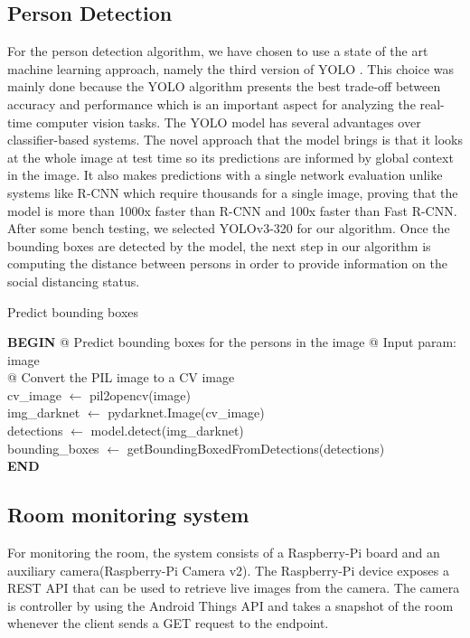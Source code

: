 \documentclass[runningheads,a4paper,11pt]{report}
\begin{document}
\subsection{Person Detection}
For the person detection algorithm, we have chosen to use a state of the art machine learning approach, namely the third version of YOLO \cite{YOLO}. This choice was mainly done because the YOLO algorithm presents the best trade-off between accuracy and performance which is an important aspect for analyzing the real-time computer vision tasks. The YOLO model has several advantages over classifier-based systems. The novel approach that the model brings is that it looks at the whole image at test time so its predictions are informed by global context in the image. It also makes predictions with a single network evaluation unlike systems like R-CNN which require thousands for a single image, proving that the model is more than 1000x faster than R-CNN and 100x faster than Fast R-CNN. After some bench testing, we selected YOLOv3-320 for our algorithm. Once the bounding boxes are detected by the model, the next step in our algorithm is computing the distance between persons in order to provide information on the social distancing status. 
\begin{algorithm}
	\caption{Predict bounding boxes}
	\label{NGalg}
		\begin{algorithmic}
		\STATE \textbf{BEGIN}
  		\STATE @ Predict bounding boxes for the persons in the image
  		\STATE @ Input param: image \\
  		\STATE @ Convert the PIL image to a CV image \\
  		\STATE cv\_image $\leftarrow$ pil2opencv(image) \\
  		\STATE img\_darknet $\leftarrow$ pydarknet.Image(cv\_image) \\
  		\STATE detections $\leftarrow$ model.detect(img\_darknet) \\
  		\STATE bounding\_boxes $\leftarrow$ getBoundingBoxedFromDetections(detections) \\
  		\STATE \textbf{END}
\end{algorithmic}
\end{algorithm}

\subsection{Room monitoring system}
For monitoring the room, the system consists of a Raspberry-Pi board and an auxiliary camera(Raspberry-Pi Camera v2). The Raspberry-Pi device exposes a REST API that can be used to retrieve live images from the camera. The camera is controller by using the Android Things API and takes a snapshot of the room whenever the client sends a GET request to the endpoint.
\end{document}

